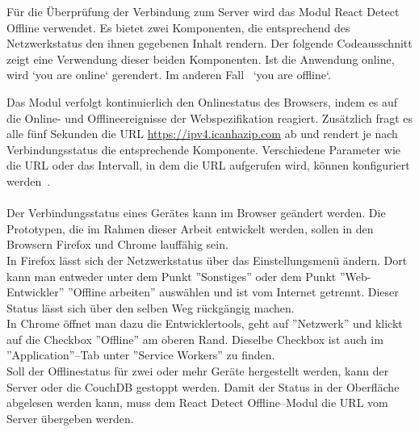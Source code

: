 Für die Überprüfung der Verbindung zum Server wird das Modul React Detect Offline verwendet.
Es bietet zwei Komponenten, die entsprechend des Netzwerkstatus den ihnen gegebenen Inhalt rendern.
Der folgende Codeausschnitt zeigt eine Verwendung dieser beiden Komponenten. Ist die Anwendung online, wird `you are online` gerendert. Im anderen Fall ~`you are offline`.
%
\begin{center}

\end{center}
%
Das Modul verfolgt kontinuierlich den Onlinestatus des Browsers, indem es auf die Online- und Offlineereignisse der Webspezifikation reagiert. Zusätzlich fragt es alle fünf Sekunden die URL \url{https://ipv4.icanhazip.com} ab und rendert je nach Verbindungsstatus die entsprechende Komponente.
Verschiedene Parameter wie die URL oder das Intervall, in dem die URL aufgerufen wird, können konfiguriert werden~\cite{react-detect}. \\\\
%
Der Verbindungsstatus eines Gerätes kann im Browser geändert werden.
Die Prototypen, die im Rahmen dieser Arbeit entwickelt werden, sollen in den Browsern Firefox und Chrome lauffähig sein.\\
In Firefox lässt sich der Netzwerkstatus über das Einstellungsmenü ändern. Dort kann man entweder unter dem Punkt ''Sonstiges'' oder dem Punkt ''Web-Entwickler'' ''Offline arbeiten'' auswählen und ist vom Internet getrennt. Dieser Status lässt sich über den selben Weg rückgängig machen.\\
In Chrome öffnet man dazu die Entwicklertools, geht auf ''Netzwerk'' und klickt auf die Checkbox ''Offline'' am oberen Rand. Dieselbe Checkbox ist auch im ''Application''--Tab unter ''Service Workers'' zu finden.\\
Soll der Offlinestatus für zwei oder mehr Geräte hergestellt werden, kann der Server oder die CouchDB gestoppt werden. Damit der Status in der Oberfläche abgelesen werden kann, muss dem React Detect Offline--Modul die URL vom Server übergeben werden.